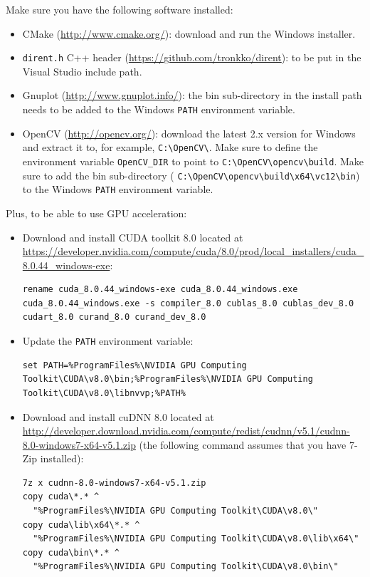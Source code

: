 \documentclass[a4paper,11pt,oneside]{article}
\newenvironment{myitemize}
{ \begin{itemize}
    \setlength{\itemsep}{0pt}
    \setlength{\parskip}{0pt}
    \setlength{\parsep}{0pt}     }
{ \end{itemize}                  }
\begin{document}
Make sure you have the following software installed:
\begin{myitemize}
    \item CMake (\url{http://www.cmake.org/}): download and run the Windows installer.
    \item \lstinline!dirent.h! C++ header (\url{https://github.com/tronkko/dirent}): to be put in the Visual Studio
    include path.
    \item Gnuplot (\url{http://www.gnuplot.info/}): the bin sub-directory in
    the install path needs to be added to the Windows \lstinline!PATH!
     environment variable.
    \item OpenCV (\url{http://opencv.org/}): download the latest 2.x version
    for Windows and extract it to, for example,
    \lstinline!C:\OpenCV\!.
  Make sure to define the environment variable \lstinline!OpenCV_DIR! to point
  to \lstinline!C:\OpenCV\opencv\build!.
  Make sure to add the bin sub-directory (%
\lstinline!C:\OpenCV\opencv\build\x64\vc12\bin!) to the Windows
  \lstinline!PATH! environment variable.
\end{myitemize}

Plus, to be able to use GPU acceleration:
\begin{myitemize}
    \item Download and install CUDA toolkit 8.0 located at \url{https://developer.nvidia.com/compute/cuda/8.0/prod/local_installers/cuda_8.0.44_windows-exe}:
\begin{lstlisting}[escapechar=!]
rename cuda_8.0.44_windows-exe cuda_8.0.44_windows.exe
cuda_8.0.44_windows.exe -s compiler_8.0 cublas_8.0 cublas_dev_8.0 cudart_8.0 curand_8.0 curand_dev_8.0
\end{lstlisting}
    \item Update the \lstinline!PATH! environment variable:
\begin{lstlisting}[escapechar=!]
set PATH=%ProgramFiles%\NVIDIA GPU Computing Toolkit\CUDA\v8.0\bin;%ProgramFiles%\NVIDIA GPU Computing Toolkit\CUDA\v8.0\libnvvp;%PATH%
\end{lstlisting}
    \item Download and install cuDNN 8.0 located at \url{http://developer.download.nvidia.com/compute/redist/cudnn/v5.1/cudnn-8.0-windows7-x64-v5.1.zip} (the following command assumes that you have 7-Zip installed):
\begin{lstlisting}[escapechar=!]
7z x cudnn-8.0-windows7-x64-v5.1.zip
copy cuda\*.* ^
  "%ProgramFiles%\NVIDIA GPU Computing Toolkit\CUDA\v8.0\"
copy cuda\lib\x64\*.* ^
  "%ProgramFiles%\NVIDIA GPU Computing Toolkit\CUDA\v8.0\lib\x64\"
copy cuda\bin\*.* ^
  "%ProgramFiles%\NVIDIA GPU Computing Toolkit\CUDA\v8.0\bin\"
\end{lstlisting}
\end{myitemize}
\end{document}
